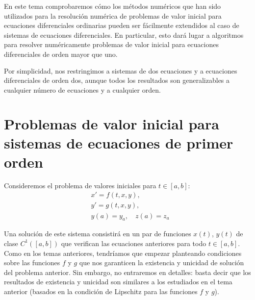 \renewcommand{\tt}{t}
\newcommand{\yy}{y}
\newcommand{\yn}{{\yy_n}}
\newcommand{\ynn}{{\yy_{n+1}}}
\newcommand{\ta}{a}
\newcommand{\tb}{b}
\newcommand{\tn}{{\tt_n}}
\newcommand{\tnn}{{\tt_{n+1}}}
\newcommand{\zn}{{z_n}}
\newcommand{\znn}{{z_{n+1}}}
\newcommand{\ycero}{{y_a}}
\newcommand{\sol}{y}
\newcommand{\lipschitz}{$y$--Lipschitz\xspace}
\newcommand{\locLipschitz}{localmente \lipschitz}
\newcommand{\globLipschitz}{\lipschitz}
\newcommand{\errCons}{{\cal E}}
\newcommand{\RK}{Runge--Kutta\xspace}
\newcommand{\AB}{Adams--Bashforth\xspace}
\newcommand{\AM}{Adams--Moulton\xspace}

En este tema comprobaremos cómo los métodos numéricos que han sido
utilizados para la resolución numérica de problemas de valor inicial
para ecuaciones diferenciales ordinarias pueden ser fácilmente
extendidos al caso de sistemas de ecuaciones diferenciales. En
particular, esto dará lugar a algoritmos para resolver numéricamente
problemas de valor inicial para ecuaciones diferenciales de orden
mayor que uno.

Por simplicidad, nos restringimos a sistemas de dos ecuaciones y a
ecuaciones diferenciales de orden dos, aunque todos los resultados son
generalizables a cualquier número de ecuaciones y a cualquier orden.

\section{Problemas de valor inicial para sistemas de ecuaciones de
  primer orden}
\label{sec:sistemas-ecuaciones-dif}

Consideremos el problema de valores iniciales para $t\in [a,b]$:
\begin{align*}
  &x' = f(t, x, y), \\
  &y' = g(t, x, y), \\
  &y(a) = y_a, \quad z(a)=z_a
\end{align*}

Una solución de este sistema consistirá en un par de funciones $x(t)$,
$y(t)$ de clase $C^1([a,b])$ que verifican las ecuaciones anteriores
para todo $t\in[a,b]$.
Como en los temas anteriores, tendríamos que empezar planteando
condiciones sobre las funciones $f$ y $g$ que nos garanticen la
existencia y unicidad de solución del problema anterior. Sin embargo,
no entraremos en detalles: basta decir que los resultados de
existencia y unicidad son similares a los estudiados en el tema
anterior (basados en la condición de Lipschitz para las funciones $f$
y $g$).

